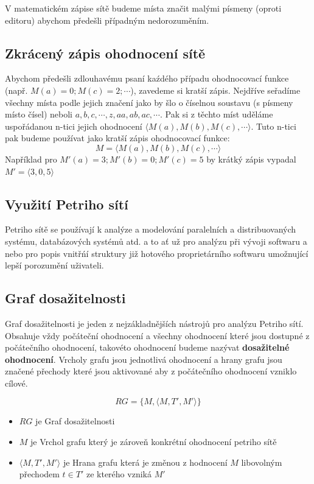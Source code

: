 \documentclass[
  biblatex,
  glossaries,
  index
]{kidiplom}
\begin{document}
V matematickém zápise sítě budeme místa značit malými písmeny (oproti editoru)
abychom předešli případným nedorozuměním.

\subsection{Zkrácený zápis ohodnocení sítě}

Abychom předešli zdlouhavému psaní kaźdého případu ohodnocovací funkce
(např. $M(a) = 0; M(c) = 2; \dotsb$), zavedeme si kratší zápis.
Nejdříve seřadíme všechny místa podle jejich značení jako by šlo 
o číselnou soustavu (s písmeny místo čísel) 
neboli $a, b, c, \dotsb, z, aa, ab, ac, \dotsb$.
Pak si z těchto míst uděláme uspořádanou n-tici jejich ohodnocení $\langle M(a), M(b), M(c), \dotsb \rangle$.
Tuto n-tici pak budeme používat jako kratší zápis ohodnocovací funkce:
$$
 M = \langle M(a), M(b), M(c), \dotsb \rangle
$$
Například pro $M'(a) = 3; M'(b) = 0; M'(c) = 5$ by krátký zápis vypadal
\\ $M' = \langle 3,0,5 \rangle$

\subsection{Využití Petriho sítí}

Petriho sítě se používají k analýze a modelování paralelních
a distribuovaných systému, databázových systémů atd. a to ať už
pro analýzu při vývoji softwaru a nebo pro popis vnitřńí struktury
již hotového proprietárního softwaru umožnující lepší porozumění uživateli.

\subsection{Graf dosažitelnosti}

Graf dosažitelnosti je jeden z nejzákladnějších nástrojů pro analýzu Petriho sítí.
Obsahuje vždy počáteční ohodnocení a všechny ohodnocení které jsou dostupné z počátečního ohodnocení, 
takovéto ohodnocení budeme nazývat \textbf{dosažitelné ohodnocení}. 
Vrcholy grafu jsou jednotlivá ohodnocení
a hrany grafu jsou značené přechody které jsou aktivované aby z počátečního ohodnocení vzniklo cílové.

\begin{definition}
  $$RG = \{M, \langle M, T', M' \rangle\}$$
  \begin{itemize}
    \item $RG$ je Graf dosažitelnosti
    \item $M$ je Vrchol grafu který je zároveň konkrétní ohodnocení petriho sítě
    \item $\langle M, T', M' \rangle$ je Hrana grafu která je změnou z hodnocení $M$ libovolným přechodem $t \in T'$ ze kterého vzniká $M'$
  \end{itemize}
\end{definition}
\end{document}
